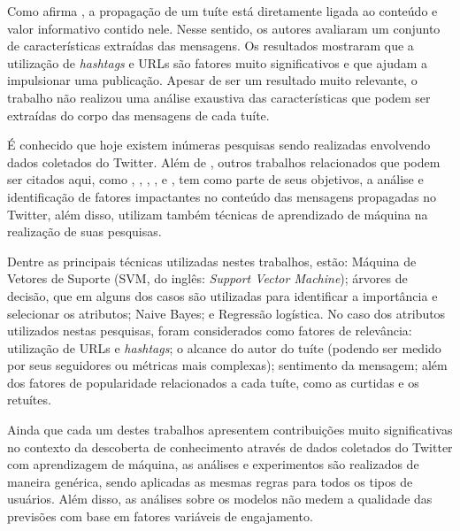 \documentclass[oneside,openright,12pt]{ufsm_2015} %
\begin{document}
{    \par Como afirma \cite{ieee:suh:10}, a propagação de um tuíte está diretamente ligada ao conteúdo e valor informativo contido nele. Nesse sentido, os autores avaliaram um conjunto de características extraídas das mensagens. Os resultados mostraram que a utilização de \textit{hashtags} e URLs são fatores muito significativos e que ajudam a impulsionar uma publicação. Apesar de ser um resultado muito relevante, o trabalho não realizou uma análise exaustiva das características que podem ser extraídas do corpo das mensagens de cada tuíte.
    
    \par É conhecido que hoje existem inúmeras pesquisas sendo realizadas envolvendo dados coletados do Twitter. Além de \cite{ieee:suh:10}, outros trabalhos relacionados que podem ser citados aqui, como \cite{acm:duan:2010}, \cite{benevenuto:2010}, \cite{acm:naveed:2011}, \cite{kharde:2016}, \cite{acm:hong:2011} e \cite{ieee:xu:2012}, tem como parte de seus objetivos, a análise e identificação de fatores impactantes no conteúdo das mensagens propagadas no Twitter, além disso, utilizam também técnicas de aprendizado de máquina na realização de suas pesquisas.
    
    \par Dentre as principais técnicas utilizadas nestes trabalhos, estão: Máquina de Vetores de Suporte (SVM, do inglês: \textit{Support Vector Machine}); árvores de decisão, que em alguns dos casos são utilizadas para identificar a importância e selecionar os atributos; Naive Bayes; e Regressão logística. No caso dos atributos utilizados nestas pesquisas, foram considerados como fatores de relevância: utilização de URLs e \textit{hashtags}; o alcance do autor do tuíte (podendo ser medido por seus seguidores ou métricas mais complexas); sentimento da mensagem; além dos fatores de popularidade relacionados a cada tuíte, como as curtidas e os retuítes.
    
    \par Ainda que cada um destes trabalhos apresentem contribuições muito significativas no contexto da descoberta de conhecimento através de dados coletados do Twitter com aprendizagem de máquina, as análises e experimentos são realizados de maneira genérica, sendo aplicadas as mesmas regras para todos os tipos de usuários. Além disso, as análises sobre os modelos não medem a qualidade das previsões com base em fatores variáveis de engajamento.

}
\end{document}
